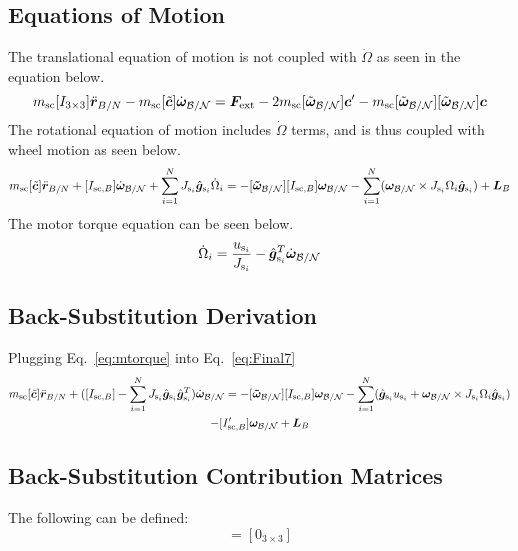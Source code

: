 \documentclass[]{BasiliskReportMemo}
\begin{document}
\subsection{Equations of Motion}
The translational equation of motion is not coupled with $\dot{\Omega}$ as seen in the equation below.
\begin{equation}
m_{\text{sc}} [I_{3 \times 3}]\ddot{\bm r}_{B/N}
-m_{\text{sc}} [\tilde{\bm{c}}] \dot{\bm\omega}_{\cal B/N} 
= \bm F_{\text{ext}}- 2 m_{\text{sc}} [\tilde{\bm\omega}_{\cal B/N}] \bm c'
-m_{\text{sc}} [\tilde{\bm\omega}_{\cal B/N}][\tilde{\bm\omega}_{\cal B/N}]\bm{c}
\label{eq:Rbddot35}
\end{equation}
The rotational equation of motion includes $\dot{\Omega}$ terms, and is thus coupled with wheel motion as seen below.
\begin{multline}
m_{\text{sc}}[\tilde{\bm{c}}] \ddot{\bm r}_{B/N}
+[I_{\text{sc},B}] \dot{\bm\omega}_{\cal B/N}
+\sum_{i=1}^{N}J_{\text{s}_i} \hat{\bm g}_{\text{s}_i}\dot{\Omega}_i
= -[\bm{\tilde{\omega}}_{\cal B/N}] [I_{\text{sc},B}] \bm\omega_{\cal B/N} - \sum_{i=1}^{N}(\bm\omega_{\cal B/N}\times J_{\text{s}_i}\Omega_i\hat{\bm g}_{\text{s}_i})
+ \bm{L}_B
\label{eq:Final7}
\end{multline}
The motor torque equation can be seen below.
\begin{equation}
\dot{\Omega}_i = \frac{u_{\text{s}_i}}{J_{\text{s}_i}}-\hat{\bm g}_{\text{s}_i}^T \dot{\bm{\omega}}_{\cal B/N}
\label{eq:mtorque}
\end{equation}

\subsection{Back-Substitution Derivation}
Plugging Eq.~\eqref{eq:mtorque} into Eq.~\eqref{eq:Final7}
\begin{multline}
m_{\text{sc}}[\tilde{\bm{c}}] \ddot{\bm r}_{B/N}
+([I_{\text{sc},B}]-\sum_{i=1}^{N}J_{\text{s}_i} \hat{\bm g}_{\text{s}_i} \hat{\bm g}_{\text{s}_i}^T) \dot{\bm\omega}_{\cal B/N}
= -[\bm{\tilde{\omega}}_{\cal B/N}] [I_{\text{sc},B}] \bm\omega_{\cal B/N} - \sum_{i=1}^{N}(\hat{\bm g}_{\text{s}_i} u_{\text{s}_i} + \bm\omega_{\cal B/N}\times J_{\text{s}_i}\Omega_i\hat{\bm g}_{\text{s}_i})
\\- [I'_{\text{sc},B}] \bm\omega_{\cal B/N}
+ \bm{L}_B
\label{eq:Final72}
\end{multline}


\subsection{Back-Substitution Contribution Matrices}
The following can be defined:
\begin{equation}
[A_\text{contr}] = [0_{3 \times 3}]
\end{equation}
\end{document}
